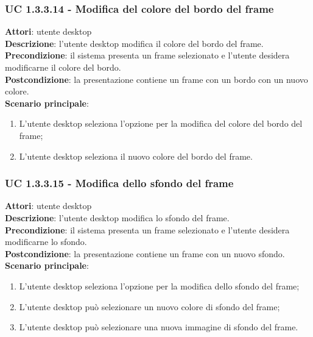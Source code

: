 \subsubsection{UC 1.3.3.14 - Modifica del colore del bordo del frame}{
	\label{uc1.3.3.14}
	\textbf{Attori}: utente desktop \\
	\textbf{Descrizione}: l'utente desktop modifica il colore del bordo del frame. \\
	\textbf{Precondizione}: il sistema presenta un frame selezionato e l'utente desidera modificarne il colore del bordo.	\\
	\textbf{Postcondizione}: la presentazione contiene un frame con un bordo con un nuovo colore.	\\
	\textbf{Scenario principale}:
	\begin{enumerate}
		\item L'utente desktop seleziona l'opzione per la modifica del colore del bordo del frame;
		\item L'utente desktop seleziona il nuovo colore del bordo del frame.
	\end{enumerate}
	}
\subsubsection{UC 1.3.3.15 - Modifica dello sfondo del frame}{
	\label{uc1.3.3.15}
	\textbf{Attori}: utente desktop \\
	\textbf{Descrizione}: l'utente desktop modifica lo sfondo del frame. \\
	\textbf{Precondizione}: il sistema presenta un frame selezionato e l'utente desidera modificarne lo sfondo.	\\
	\textbf{Postcondizione}: la presentazione contiene un frame con un nuovo sfondo.	\\
	\textbf{Scenario principale}:
	\begin{enumerate}
		\item L'utente desktop seleziona l'opzione per la modifica dello sfondo del frame;
		\item L'utente desktop può selezionare un nuovo colore di sfondo del frame;
		\item L'utente desktop può selezionare una nuova immagine di sfondo del frame.
	\end{enumerate}
	}
